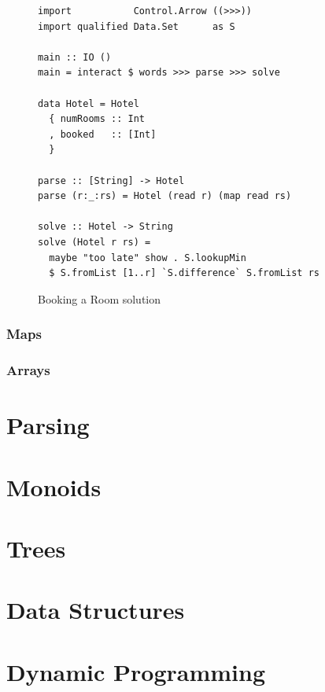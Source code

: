 \documentclass{book}
\begin{document}
\begin{figure}
  \centering
\begin{verbatim}
import           Control.Arrow ((>>>))
import qualified Data.Set      as S

main :: IO ()
main = interact $ words >>> parse >>> solve

data Hotel = Hotel
  { numRooms :: Int
  , booked   :: [Int]
  }

parse :: [String] -> Hotel
parse (r:_:rs) = Hotel (read r) (map read rs)

solve :: Hotel -> String
solve (Hotel r rs) =
  maybe "too late" show . S.lookupMin
  $ S.fromList [1..r] `S.difference` S.fromList rs
\end{verbatim}
  \caption{Booking a Room solution}
  \label{fig:bookingaroom}
\end{figure}

\subsection{Maps}
\label{sec:maps}

\subsection{Arrays}
\label{sec:arrays}

\chapter{Parsing}
\label{chap:parsing}

\chapter{Monoids}
\label{chap:monoids}

\chapter{Trees}
\label{chap:trees}

\chapter{Data Structures}
\label{chap:data-structures}

\chapter{Dynamic Programming}
\label{chap:dp}
\end{document}
